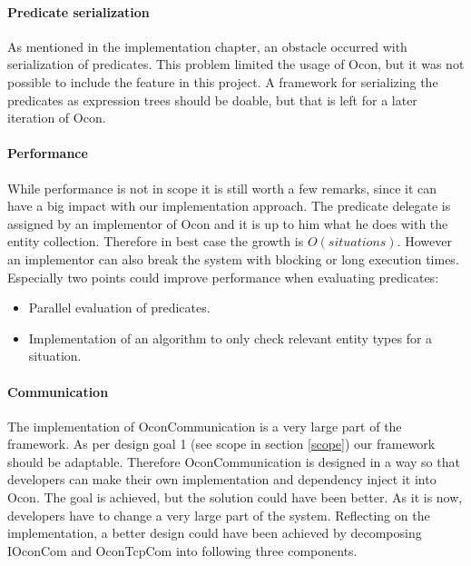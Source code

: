 \documentclass[../report.tex]{subfiles}
\begin{document}
\graphicspath{{img/}{../img/}}

\paragraph{Predicate serialization}
As mentioned in the implementation chapter, an obstacle occurred with serialization of predicates. This problem limited the usage of Ocon, but it was not possible to include the feature in this project. A framework for serializing the predicates as expression trees should be doable, but that is left for a later iteration of Ocon.


\paragraph{Performance}

While performance is not in scope it is still worth a few remarks, since it can have a big impact with our implementation approach. The predicate delegate is assigned by an implementor of Ocon and it is up to him what he does with the entity collection. Therefore in best case the growth is $ O(situations) $. However an implementor can also break the system with blocking or long execution times. \\
Especially two points could improve performance when evaluating predicates:

\begin{itemize}
\item Parallel evaluation of predicates.
\item Implementation of an algorithm to only check relevant entity types for a situation.
\end{itemize}

\paragraph{Communication}
The implementation of OconCommunication is a very large part of the framework. As per design goal 1 (see scope in section \ref{scope}) our framework should be adaptable. Therefore OconCommunication is designed in a way so that developers can make their own implementation and dependency inject it into Ocon. The goal is achieved, but the solution could have been better. As it is now, developers have to change a very large part of the system. Reflecting on the implementation, a better design could have been achieved by decomposing IOconCom and OconTcpCom into following three components.
\end{document}
